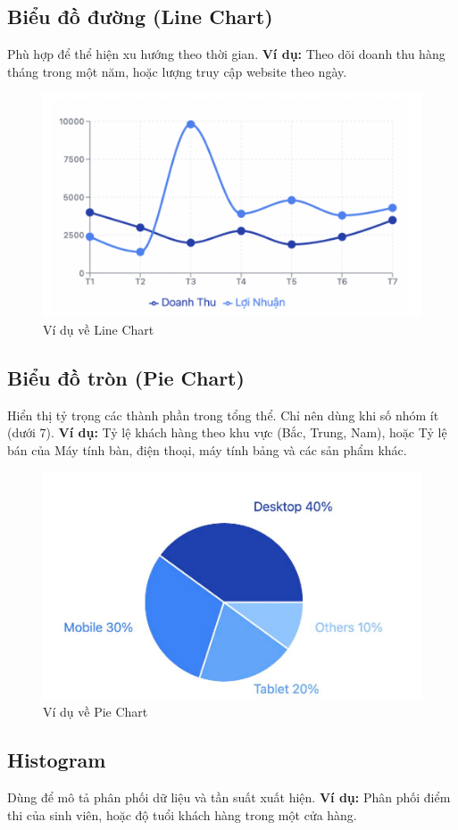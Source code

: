 \documentclass[11pt]{article}
\begin{document}
\subsection{Biểu đồ đường (Line Chart)}
Phù hợp để thể hiện xu hướng theo thời gian.
\textbf{Ví dụ:} Theo dõi doanh thu hàng tháng trong một năm, hoặc lượng truy cập website theo ngày.

\begin{figure}[H]
    \centering
    \includegraphics[width=0.6\linewidth]{images/lineChart.png}
    \caption{Ví dụ về Line Chart}
    \label{fig:line chart}
\end{figure}

\subsection{Biểu đồ tròn (Pie Chart)}
Hiển thị tỷ trọng các thành phần trong tổng thể. Chỉ nên dùng khi số nhóm ít (dưới 7).
\textbf{Ví dụ:} Tỷ lệ khách hàng theo khu vực (Bắc, Trung, Nam), hoặc Tỷ lệ bán của Máy tính bàn, điện thoại, máy tính bảng và các sản phẩm khác.

\begin{figure}[H]
    \centering
    \includegraphics[width=0.6\linewidth]{images/pieChart.png}
    \caption{Ví dụ về Pie Chart}
    \label{fig:piechart}
\end{figure}

\subsection{Histogram}
Dùng để mô tả phân phối dữ liệu và tần suất xuất hiện.
\textbf{Ví dụ:} Phân phối điểm thi của sinh viên, hoặc độ tuổi khách hàng trong một cửa hàng.
\end{document}
